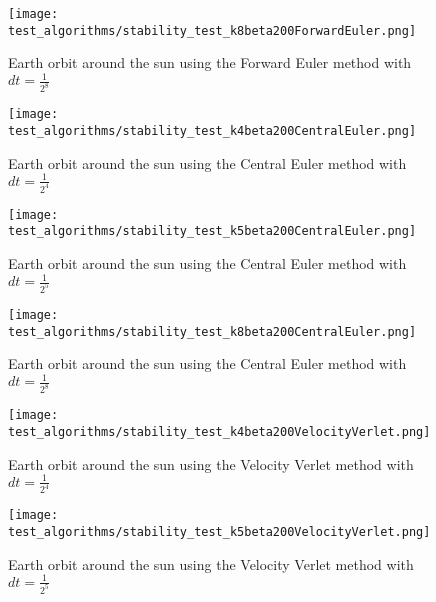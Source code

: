 \FloatBarrier
\begin{figure}[!ht]
\centering
\FloatBarrier
\texttt{[image: test\_algorithms/stability\_test\_k8beta200ForwardEuler.png]}

\caption{Earth orbit around the sun using the Forward Euler method with $dt = \frac{1}{2^8}$}
\label{fig:Earth_orbit_sun_Forward_Euler_k_8}
\end{figure}
\FloatBarrier


\FloatBarrier
\begin{figure}[!ht]
\centering
\FloatBarrier
\texttt{[image: test\_algorithms/stability\_test\_k4beta200CentralEuler.png]}

\caption{Earth orbit around the sun using the Central Euler method with $dt = \frac{1}{2^4}$}
\label{fig:Earth_orbit_sun_Forward_Euler_k_8}
\end{figure}
\FloatBarrier


\FloatBarrier
\begin{figure}[!ht]
\centering
\FloatBarrier
\texttt{[image: test\_algorithms/stability\_test\_k5beta200CentralEuler.png]}

\caption{Earth orbit around the sun using the Central Euler method with $dt = \frac{1}{2^5}$}
\label{fig:Earth_orbit_sun_Forward_Euler_k_8}
\end{figure}
\FloatBarrier

\FloatBarrier
\begin{figure}[!ht]
\centering
\FloatBarrier
\texttt{[image: test\_algorithms/stability\_test\_k8beta200CentralEuler.png]}

\caption{Earth orbit around the sun using the Central Euler method with $dt = \frac{1}{2^8}$}
\label{fig:Earth_orbit_sun_Forward_Euler_k_8}
\end{figure}
\FloatBarrier


\FloatBarrier
\begin{figure}[!ht]
\centering
\FloatBarrier
\texttt{[image: test\_algorithms/stability\_test\_k4beta200VelocityVerlet.png]}

\caption{Earth orbit around the sun using the Velocity Verlet method with $dt = \frac{1}{2^4}$}
\label{fig:Earth_orbit_sun_Forward_Euler_k_8}
\end{figure}
\FloatBarrier



\FloatBarrier
\begin{figure}[!ht]
\centering
\FloatBarrier
\texttt{[image: test\_algorithms/stability\_test\_k5beta200VelocityVerlet.png]}

\caption{Earth orbit around the sun using the Velocity Verlet method with $dt = \frac{1}{2^5}$}
\label{fig:Earth_orbit_sun_Forward_Euler_k_8}
\end{figure}
\FloatBarrier


